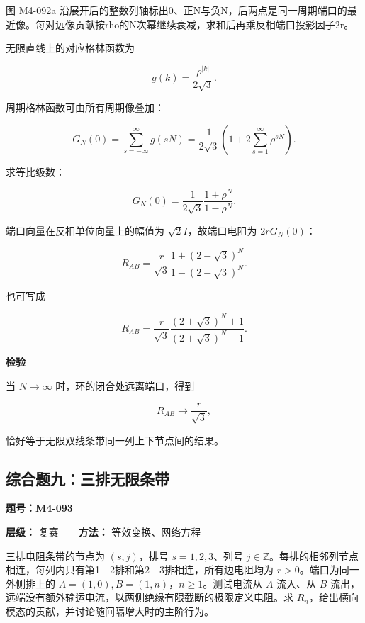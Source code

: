 图 M4-092a
沿展开后的整数列轴标出0、正N与负N，后两点是同一周期端口的最近像。每对远像贡献按rho的N次幂继续衰减，求和后再乘反相端口投影因子2r。

无限直线上的对应格林函数为

\[
g(k)=\frac{\rho^{|k|}}{2\sqrt3}.
\]

周期格林函数可由所有周期像叠加：

\[
G_N(0)=\sum_{s=-\infty}^{\infty}g(sN)
=\frac1{2\sqrt3}\left(1+2\sum_{s=1}^{\infty}\rho^{sN}\right).
\]

求等比级数：

\[
G_N(0)=\frac1{2\sqrt3}\frac{1+\rho^N}{1-\rho^N}.
\]

端口向量在反相单位向量上的幅值为 \(\sqrt2I\)，故端口电阻为
\(2rG_N(0)\)：

\[
\boxed{
R_{AB}=\frac r{\sqrt3}\frac{1+(2-\sqrt3)^N}{1-(2-\sqrt3)^N}
}.
\]

也可写成

\[
R_{AB}=\frac r{\sqrt3}\frac{(2+\sqrt3)^N+1}{(2+\sqrt3)^N-1}.
\]

\textbf{检验}

当 \(N\to\infty\) 时，环的闭合处远离端口，得到

\[
R_{AB}\to\frac r{\sqrt3},
\]

恰好等于无限双线条带同一列上下节点间的结果。

\par{}
\noindent\begin{minipage}{\linewidth}

\subsection{综合题九：三排无限条带}\label{m4:ux7efcux5408ux9898ux4e5dux4e09ux6392ux65e0ux9650ux6761ux5e26}

\textbf{题号：M4-093}

\textbf{层级：} 复赛　　\textbf{方法：} 等效变换、网络方程

三排电阻条带的节点为 \((s,j)\)，排号 \(s=1,2,3\)、列号
\(j\in\mathbb Z\)。每排的相邻列节点相连，每列内只有第1---2排和第2---3排相连，所有边电阻均为
\(r>0\)。端口为同一外侧排上的 \(A=(1,0),B=(1,n)\)，\(n\ge1\)。测试电流从
\(A\) 流入、从 \(B\)
流出，远端没有额外输运电流，以两侧绝缘有限截断的极限定义电阻。求
\(R_n\)，给出横向模态的贡献，并讨论随间隔增大时的主阶行为。

\end{minipage}\par

